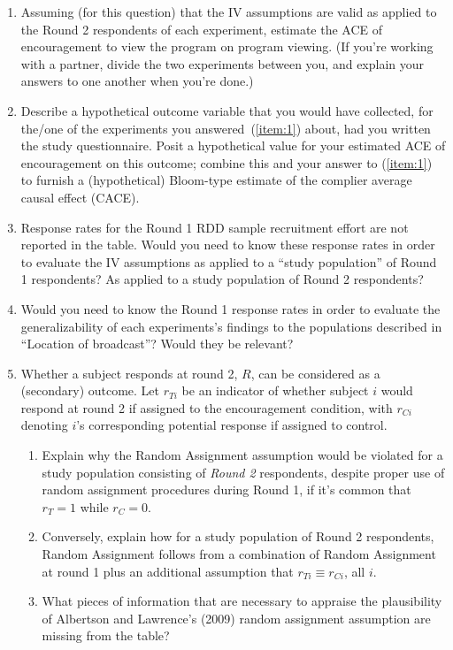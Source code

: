 \documentclass{article}
\begin{document}
\begin{enumerate}
\item \label{item:1}Assuming (for this question) that the IV assumptions are valid as applied to the Round 2 respondents of each experiment, estimate the ACE of encouragement to view the program on program viewing. (If you're working with a partner, divide the two experiments between you, and explain your answers to one another when you're done.)
\item Describe a hypothetical outcome variable that you would have collected, for the/one of the experiments you answered~(\ref{item:1}) about,  had you written the study questionnaire. Posit a hypothetical value for your estimated ACE of encouragement on this outcome; combine this and your answer to (\ref{item:1}) to furnish a (hypothetical) Bloom-type estimate of the complier average causal effect (CACE).  
\item Response rates for the Round 1 RDD sample recruitment effort are not reported in the table. Would you need to know these response rates in order to evaluate the IV assumptions as applied to a ``study population'' of Round 1 respondents?  As applied to a study population of Round 2 respondents? 
\item Would you need to know the Round 1 response rates in order to evaluate the generalizability of each experiments's findings to the populations described in ``Location of broadcast''?  Would they be relevant?  
\item Whether a subject responds at round 2, $R$, can be considered as a (secondary) outcome. Let $r_{Ti}$ be an indicator of whether subject $i$ would respond at round 2 if assigned to the encouragement condition, with $r_{Ci}$ denoting $i$'s corresponding potential response if assigned to control.
  \begin{enumerate}
  \item Explain why the Random Assignment assumption would be violated for a study population consisting of \textit{Round 2} respondents, despite proper use of random assignment procedures during Round 1, if it's common that $r_{T}=1$ while $r_{C}=0$.
  \item Conversely, explain how for a study population of Round 2 respondents, Random Assignment follows from a combination of Random Assignment at round 1 plus an additional assumption that $r_{Ti} \equiv r_{Ci}$, all $i$. 
  \item What pieces of information that are necessary to appraise the plausibility of Albertson and Lawrence's (2009) random assignment assumption are missing from the table? 
  \end{enumerate}

\end{enumerate}
\end{document}
